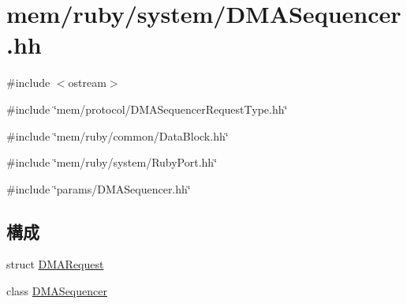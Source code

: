 \hypertarget{DMASequencer_8hh}{
\section{mem/ruby/system/DMASequencer.hh}
\label{DMASequencer_8hh}
}
{\ttfamily \#include $<$ostream$>$}\par
{\ttfamily \#include \char`\"{}mem/protocol/DMASequencerRequestType.hh\char`\"{}}\par
{\ttfamily \#include \char`\"{}mem/ruby/common/DataBlock.hh\char`\"{}}\par
{\ttfamily \#include \char`\"{}mem/ruby/system/RubyPort.hh\char`\"{}}\par
{\ttfamily \#include \char`\"{}params/DMASequencer.hh\char`\"{}}\par
\subsection*{構成}
\begin{DoxyCompactItemize}
\item 
struct \hyperlink{structDMARequest}{DMARequest}
\item 
class \hyperlink{classDMASequencer}{DMASequencer}
\end{DoxyCompactItemize}
